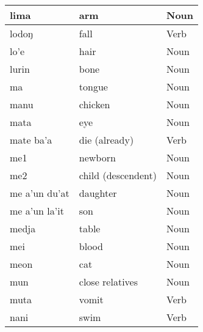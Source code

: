 \documentclass{article}
\begin{document}
\begin{longtable}{|l|l|l|}
\multirow{-2}{*}{lima}  & arm                 & \multirow{-2}{*}{{\color[HTML]{009901} Noun}}      \\ \hline
lodoŋ                   & fall                & {\color[HTML]{009901} Verb}                        \\ \hline
lo'e                    & hair                & {\color[HTML]{009901} Noun}                        \\ \hline
lurin                   & bone                & {\color[HTML]{009901} Noun}                        \\ \hline
ma                      & tongue              & {\color[HTML]{009901} Noun}                        \\ \hline
manu                    & chicken             & {\color[HTML]{009901} Noun}                        \\ \hline
mata                    & eye                 & {\color[HTML]{009901} Noun}                        \\ \hline
mate ba'a               & die (already)       & {\color[HTML]{009901} Verb}                        \\ \hline
me1                     & newborn             & {\color[HTML]{009901} Noun}                        \\ \hline
me2                     & child (descendent)  & {\color[HTML]{009901} Noun}                        \\ \hline
me a'un du'at           & daughter            & {\color[HTML]{009901} Noun}                        \\ \hline
me a'un la'it           & son                 & {\color[HTML]{009901} Noun}                        \\ \hline
medja                   & table               & {\color[HTML]{009901} Noun}                        \\ \hline
mei                     & blood               & {\color[HTML]{009901} Noun}                        \\ \hline
meon                    & cat                 & {\color[HTML]{009901} Noun}                        \\ \hline
mun                     & close relatives     & {\color[HTML]{009901} Noun}                        \\ \hline
muta                    & vomit               & {\color[HTML]{009901} Verb}                        \\ \hline
nani                    & swim                & {\color[HTML]{009901} Verb}                        \\ \hline

\end{longtable}
\end{document}
